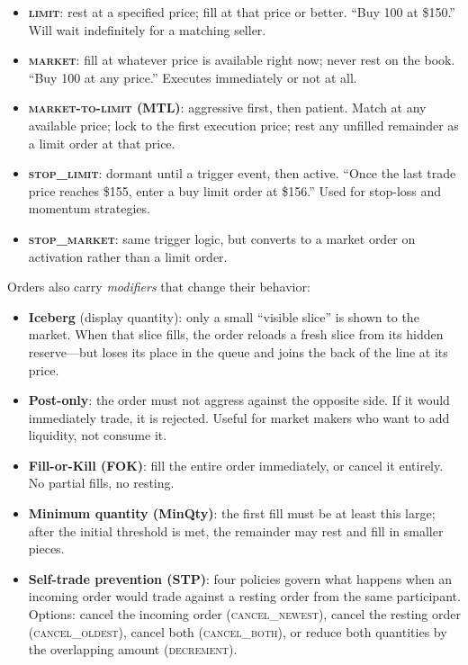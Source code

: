 \documentclass[11pt,a4paper]{article}
\begin{document}
\begin{itemize}[nosep]
\item \textbf{\textsc{limit}}: rest at a specified price; fill at that
      price or better. ``Buy 100 at \$150.'' Will wait indefinitely for
      a matching seller.

\item \textbf{\textsc{market}}: fill at whatever price is available
      right now; never rest on the book. ``Buy 100 at any price.''
      Executes immediately or not at all.

\item \textbf{\textsc{market-to-limit} (MTL)}: aggressive first, then
      patient. Match at any available price; lock to the first execution
      price; rest any unfilled remainder as a limit order at that price.

\item \textbf{\textsc{stop\_limit}}: dormant until a trigger event,
      then active. ``Once the last trade price reaches \$155, enter a
      buy limit order at \$156.'' Used for stop-loss and momentum
      strategies.

\item \textbf{\textsc{stop\_market}}: same trigger logic, but converts
      to a market order on activation rather than a limit order.
\end{itemize}

Orders also carry \emph{modifiers} that change their behavior:

\begin{itemize}[nosep]
\item \textbf{Iceberg} (display quantity): only a small ``visible
      slice'' is shown to the market. When that slice fills, the order
      reloads a fresh slice from its hidden reserve---but loses its
      place in the queue and joins the back of the line at its price.

\item \textbf{Post-only}: the order must not aggress against the
      opposite side. If it would immediately trade, it is rejected.
      Useful for market makers who want to add liquidity, not consume
      it.

\item \textbf{Fill-or-Kill (FOK)}: fill the entire order immediately,
      or cancel it entirely. No partial fills, no resting.

\item \textbf{Minimum quantity (MinQty)}: the first fill must be at
      least this large; after the initial threshold is met, the
      remainder may rest and fill in smaller pieces.

\item \textbf{Self-trade prevention (STP)}: four policies govern what
      happens when an incoming order would trade against a resting order
      from the same participant. Options: cancel the incoming order
      (\textsc{cancel\_newest}), cancel the resting order
      (\textsc{cancel\_oldest}), cancel both
      (\textsc{cancel\_both}), or reduce both quantities by the
      overlapping amount (\textsc{decrement}).
\end{itemize}
\end{document}

